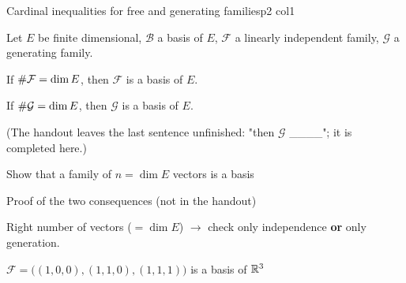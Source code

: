 \documentclass[course,noautoquant,noautokw]{neyvia-study}
\begin{document}
\begin{concept}[1.37]{Cardinal inequalities for free and generating families}{p2 col1}
\begin{definition}
\noindent Let $E$ be finite dimensional, $\mathcal B$ a basis of $E$, $\mathcal F$ a linearly independent family, $\mathcal G$ a generating family.
\par\noindent If $\#\mathcal F=\dim E$, then $\mathcal F$ is a basis of $E$.
\par\noindent If $\#\mathcal G=\dim E$, then $\mathcal G$ is a basis of $E$.
\par\noindent (The handout leaves the last sentence unfinished: "then $\mathcal G$ \_\_\_\_"; it is completed here.)
\end{definition}
\begin{method}{Show that a family of $n=\dim E$ vectors is a basis}
\step{$\displaystyle \cdots$}
\end{method}
\begin{method}{Proof of the two consequences (not in the handout)}
\end{method}
\begin{reflex}
Right number of vectors ($=\dim E$) \ensuremath{\rightarrow} check only independence \textbf{or} only generation.
\end{reflex}
\begin{worked}{$\mathcal F=\big((1,0,0),(1,1,0),(1,1,1)\big)$ is a basis of $\mathbb{R}^3$}

\end{worked}
\end{concept}
\end{document}
